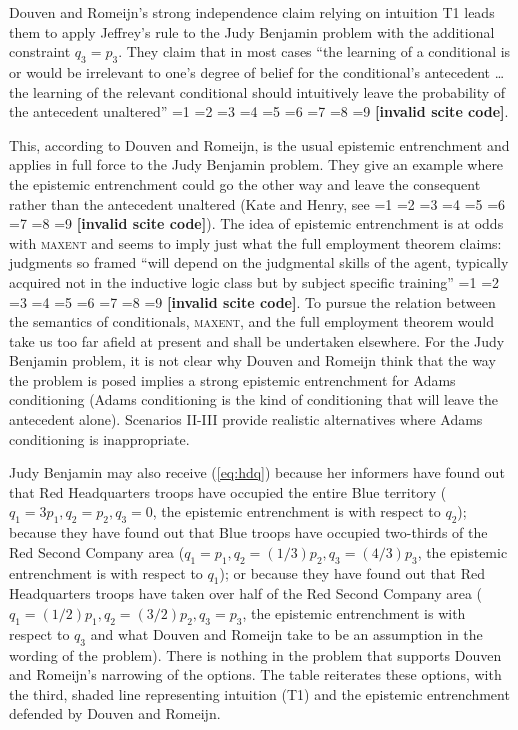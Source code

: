 \documentclass[smallextended]{svjour3}       %
\newcommand{\qeins}[1]{``#1''}
\newcommand{\PageP}{p.~}
\newcommand{\PageP}{}
\newcommand{\scite}[3]{\ifnum#1=1\cite{#2}\else
\ifnum#1=2\cite[{\PageP}~#3]{#2}\else
\ifnum#1=3\cite[{\PageP}~#3]{#2}\else
\ifnum#1=4\cite{#2}\else
\ifnum#1=5\cite{#2}\else
\ifnum#1=6\cite[{\PageP}~#3]{#2}\else
\ifnum#1=7\cite{#2}\else
\ifnum#1=8\cite[{\PageP}~#3]{#2}\else
\ifnum#1=9\cite[{\PageP}~#3]{#2}\else
\textbf{[invalid scite code]}\fi\fi\fi\fi\fi\fi\fi\fi\fi}
\begin{document}
Douven and Romeijn's strong independence claim relying on intuition T1
leads them to apply Jeffrey's rule to the Judy Benjamin problem with
the additional constraint $q_{3}=p_{3}$. They claim that in most cases
\qeins{the learning of a conditional is or would be irrelevant to
  one's degree of belief for the conditional's antecedent {\ldots} the
  learning of the relevant conditional should intuitively leave the
  probability of the antecedent unaltered}
\scite{2}{douvenromeijn09}{9}.

This, according to Douven and Romeijn, is the usual epistemic
entrenchment and applies in full force to the Judy Benjamin problem.
They give an example where the epistemic entrenchment could go the
other way and leave the consequent rather than the antecedent
unaltered (Kate and Henry, see \scite{8}{douvenromeijn09}{13}). The
idea of epistemic entrenchment is at odds with \textsc{maxent} and
seems to imply just what the full employment theorem claims: judgments
so framed \qeins{will depend on the judgmental skills of the agent,
  typically acquired not in the inductive logic class but by subject
  specific training} \scite{2}{bradley05}{349}. To pursue the
relation between the semantics of conditionals, \textsc{maxent}, and
the full employment theorem would take us too far afield at present
and shall be undertaken elsewhere. For the Judy Benjamin problem, it
is not clear why Douven and Romeijn think that the way the problem is
posed implies a strong epistemic entrenchment for Adams conditioning
(Adams conditioning is the kind of conditioning that will leave the
antecedent alone). Scenarios II-III provide realistic alternatives
where Adams conditioning is inappropriate.

Judy Benjamin may also receive ({\ref{eq:hdq}}) because her informers
have found out that Red Headquarters troops have occupied the entire
Blue territory ($q_{1}=3p_{1},q_{2}=p_{2},q_{3}=0$, the epistemic
entrenchment is with respect to $q_{2}$); because they have found out
that Blue troops have occupied two-thirds of the Red Second Company
area ($q_{1}=p_{1},q_{2}=(1/3)p_{2},q_{3}=(4/3)p_{3}$, the epistemic
entrenchment is with respect to $q_{1}$); or because they have found
out that Red Headquarters troops have taken over half of the Red
Second Company area ($q_{1}=(1/2)p_{1},q_{2}=(3/2)p_{2},q_{3}=p_{3}$,
the epistemic entrenchment is with respect to $q_{3}$ and what Douven
and Romeijn take to be an assumption in the wording of the problem).
There is nothing in the problem that supports Douven and Romeijn's
narrowing of the options. The table reiterates these options, with the
third, shaded line representing intuition (T1) and the epistemic
entrenchment defended by Douven and Romeijn.
\end{document}
